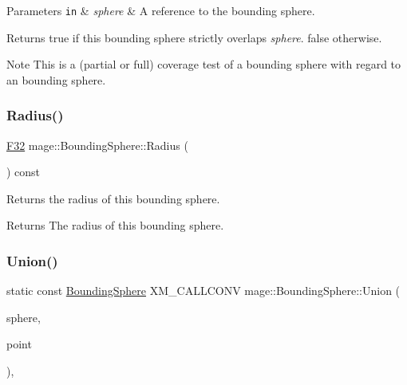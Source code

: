 \begin{DoxyParams}[1]{Parameters}
\mbox{\tt in}  & {\em sphere} & A reference to the bounding sphere. \\
\hline
\end{DoxyParams}
\begin{DoxyReturn}{Returns}
{\ttfamily true} if this bounding sphere strictly overlaps {\itshape sphere}. {\ttfamily false} otherwise. 
\end{DoxyReturn}
\begin{DoxyNote}{Note}
This is a (partial or full) coverage test of a bounding sphere with regard to an bounding sphere. 
\end{DoxyNote}
\mbox{\label{classmage_1_1_bounding_sphere_a51c7e6db89c68d192961bfaf2114fb2f}} 
\subsubsection{\texorpdfstring{Radius()}{Radius()}}
{\footnotesize\ttfamily \mbox{\hyperlink{namespacemage_aa97e833b45f06d60a0a9c4fc22ae02c0}{F32}} mage\+::\+Bounding\+Sphere\+::\+Radius (\begin{DoxyParamCaption}{ }\end{DoxyParamCaption}) const\hspace{0.3cm}{\ttfamily [noexcept]}}

Returns the radius of this bounding sphere.

\begin{DoxyReturn}{Returns}
The radius of this bounding sphere. 
\end{DoxyReturn}
\mbox{\label{classmage_1_1_bounding_sphere_a519f2f7bf6439ea384d5da60557223bf}} 
\subsubsection{\texorpdfstring{Union()}{Union()}\hspace{0.1cm}{\footnotesize\ttfamily [1/3]}}
{\footnotesize\ttfamily static const \mbox{\hyperlink{classmage_1_1_bounding_sphere}{Bounding\+Sphere}} X\+M\+\_\+\+C\+A\+L\+L\+C\+O\+NV mage\+::\+Bounding\+Sphere\+::\+Union (\begin{DoxyParamCaption}\item[{const \mbox{\hyperlink{classmage_1_1_bounding_sphere}{Bounding\+Sphere}} \&}]{sphere,  }\item[{const \mbox{\hyperlink{structmage_1_1_point3}{Point3}} \&}]{point }\end{DoxyParamCaption})\hspace{0.3cm}{\ttfamily [static]}, {\ttfamily [noexcept]}}

